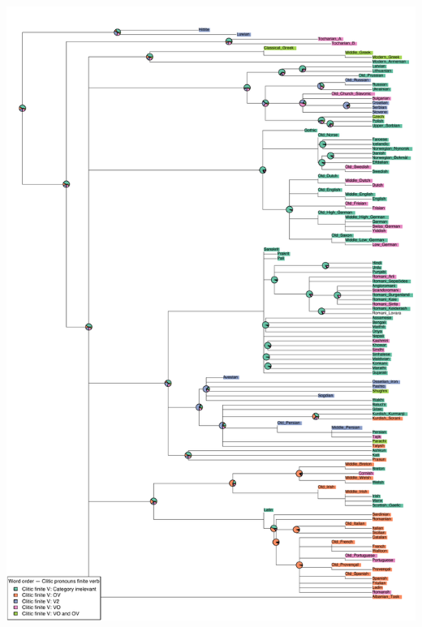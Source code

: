 \includegraphics[width=.9\linewidth]{supp-graphics/WordorderCliticpronounsfiniteverb2ndpositionWordorderCliticpronounsfiniteverbOVWordorderCliticpronounsfiniteverbVO.pdf}

